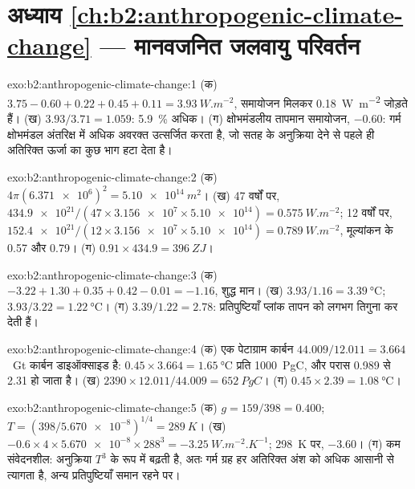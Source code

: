 \section*{अध्याय \ref{ch:b2:anthropogenic-climate-change} --- मानवजनित जलवायु परिवर्तन}

\begin{solution}{exo:b2:anthropogenic-climate-change:1}
(क) $3.75 - 0.60 + 0.22 + 0.45 + 0.11 = \qty{3.93}{W.m^{-2}}$, समायोजन मिलकर
\qty{0.18}{W.m^{-2}} जोड़ते हैं। (ख) $3.93/3.71 = 1.059$: \qty{5.9}{\percent} अधिक। (ग) क्षोभमंडलीय
तापमान समायोजन, $-0.60$: गर्म क्षोभमंडल अंतरिक्ष में अधिक अवरक्त उत्सर्जित करता है, जो सतह के
अनुक्रिया देने से पहले ही अतिरिक्त ऊर्जा का कुछ भाग हटा देता है।
\end{solution}

\begin{solution}{exo:b2:anthropogenic-climate-change:2}
(क) $4\pi(\num{6.371e6})^2 = \qty{5.10e14}{m^2}$। (ख) 47 वर्षों पर, $\num{434.9e21}/(47 \times
\num{3.156e7} \times \num{5.10e14}) = \qty{0.575}{W.m^{-2}}$; 12 वर्षों पर, $\num{152.4e21}/(12
\times \num{3.156e7} \times \num{5.10e14}) = \qty{0.789}{W.m^{-2}}$, मूल्यांकन के 0.57 और
0.79। (ग) $0.91 \times 434.9 = \qty{396}{ZJ}$।
\end{solution}

\begin{solution}{exo:b2:anthropogenic-climate-change:3}
(क) $-3.22 + 1.30 + 0.35 + 0.42 - 0.01 = \num{-1.16}$, शुद्ध मान। (ख) $3.93/1.16 =
\qty{3.39}{\celsius}$; $3.93/3.22 = \qty{1.22}{\celsius}$। (ग) $3.39/1.22 = 2.78$: प्रतिपुष्टियाँ
प्लांक तापन को लगभग तिगुना कर देती हैं।
\end{solution}

\begin{solution}{exo:b2:anthropogenic-climate-change:4}
(क) एक पेटाग्राम कार्बन $44.009/12.011 = 3.664$~\unit{Gt} कार्बन डाइऑक्साइड है: $0.45 \times 3.664 =
\qty{1.65}{\celsius}$ प्रति \qty{1000}{PgC}, और परास 0.989 से 2.31 हो जाता है। (ख) $2390 \times
12.011/44.009 = \qty{652}{PgC}$। (ग) $0.45 \times 2.39 = \qty{1.08}{\celsius}$।
\end{solution}

\begin{solution}{exo:b2:anthropogenic-climate-change:5}
(क) $g = 159/398 = 0.400$; $T = (398/\num{5.670e-8})^{1/4} = \qty{289}{K}$। (ख) $-0.6 \times 4
\times \num{5.670e-8} \times 288^3 = \qty{-3.25}{W.m^{-2}.K^{-1}}$; \qty{298}{K} पर, $-3.60$।
(ग) कम संवेदनशील: अनुक्रिया $T^3$ के रूप में बढ़ती है, अतः गर्म ग्रह हर अतिरिक्त अंश को अधिक
आसानी से त्यागता है, अन्य प्रतिपुष्टियाँ समान रहने पर।
\end{solution}

